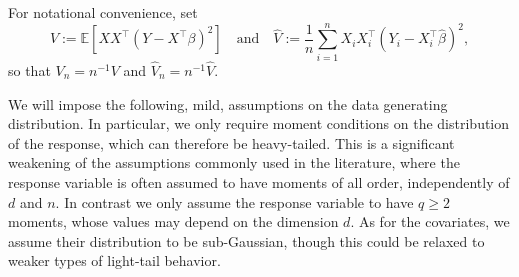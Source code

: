 \documentclass[11pt]{article}
\let\hat\widehat
\begin{document}
For notational convenience, set
\[
V := \mathbb{E}[XX^{\top}(Y - X^{\top}\beta)^2]\quad\mbox{and}\quad \widehat{V} := \frac{1}{n}\sum_{i=1}^n X_iX_i^{\top}(Y_i - X_i^{\top}\widehat{\beta})^2,
\]
so that $V_n = n^{-1}V$ and $\widehat{V}_n = n^{-1}\widehat{V}$.


We will impose the following, mild, assumptions on the data generating distribution. In particular, we only require moment conditions  on the distribution of the response, which can therefore be heavy-tailed. This is a significant weakening of the assumptions commonly used in the literature, where the response variable is often assumed to have moments of all order, independently of $d$ and $n$. In contrast we only assume the response variable to have $q \geq 2 $ moments, whose values may depend on the dimension $d$.  As for the covariates,  we assume  their distribution to be sub-Gaussian, though this could be  relaxed to weaker types of light-tail behavior.
\end{document}
